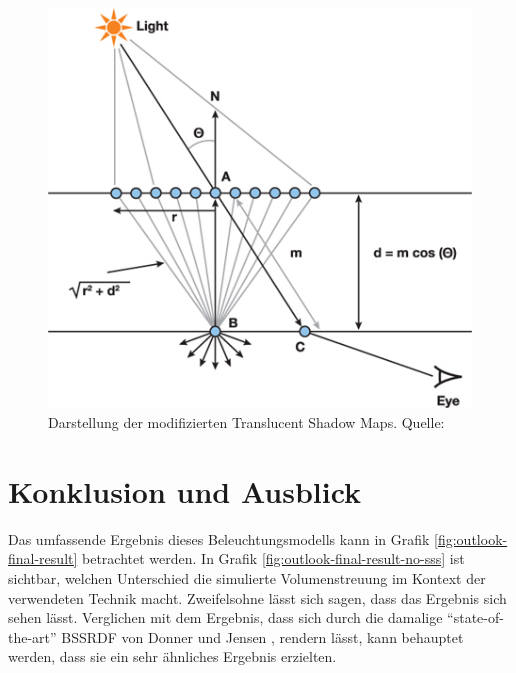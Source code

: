 \documentclass[ngerman,runningheads,a4paper]{llncs}[2018/03/10]
\begin{document}
\begin{figure}
  \centering
  \includegraphics[scale=0.2,keepaspectratio]{./images/tsm-visualization.jpg}
  \caption{
    Darstellung der modifizierten Translucent Shadow Maps. Quelle: \citet{advanced-realtime-skin-rendering}
  }
  \label{fig:tsm-darstellung}
\end{figure}

\section{Konklusion und Ausblick}
\label{sec:outlook}

Das umfassende Ergebnis dieses Beleuchtungsmodells kann in Grafik \ref{fig:outlook-final-result} betrachtet werden.
In Grafik \ref{fig:outlook-final-result-no-sss} ist sichtbar, welchen Unterschied die simulierte Volumenstreuung im Kontext der verwendeten Technik macht.
Zweifelsohne lässt sich sagen, dass das Ergebnis sich sehen lässt.
Verglichen mit dem Ergebnis, dass sich durch die damalige \enquote{state-of-the-art} BSSRDF von Donner und Jensen \cite{spectral-bssrdf-human-skin}, rendern lässt, kann behauptet werden, dass sie ein sehr ähnliches Ergebnis erzielten.
\\
\end{document}
